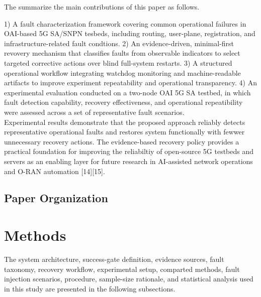 \documentclass[conference]{IEEEtran}
\begin{document}
The summarize the main contributions of this paper as follows.

1) A fault characterization framework covering common operational  failures in OAI-based 5G SA/SNPN tesbeds, including routing, user-plane, registration, and infrastructure-related fault condtions.
2) An evidence-driven, minimal-first revovery mechanism that classifies faults from observable indicators to select targeted corrective actions over blind full-system restarts.
3) A structured operational workflow integrating watchdog monitoring and machine-readable artifacts to improve experiment repeatability and operational transparency.
4) An experimental evaluation conducted on a two-node OAI 5G SA testbed, in which fault detection capability, recovery effectiveness, and operational repeatibility were assessed across a set of representative fault scenarios.\\

Experimental results demonstrate that the proposed approach reliably detects representative operational faults and restores system functionally with fewwer unnecessary recovery actions. The evidence-based recovery policy provides a practical foundation for improving the reliabiltiy of open-source 5G testbeds and servers as an enabling layer for future research in AI-assisted network operations and O-RAN automation [14][15].

\subsection{Paper Organization}

\section{Methods}
The system architecture, success-gate definition, evidence sources, fault taxonomy, recovery workflow, experimental setup, comparted methods, fault injection scenarios, procedure, sample-size rationale, and statistical analysis used in this study are presented in the following subsections.
\end{document}
